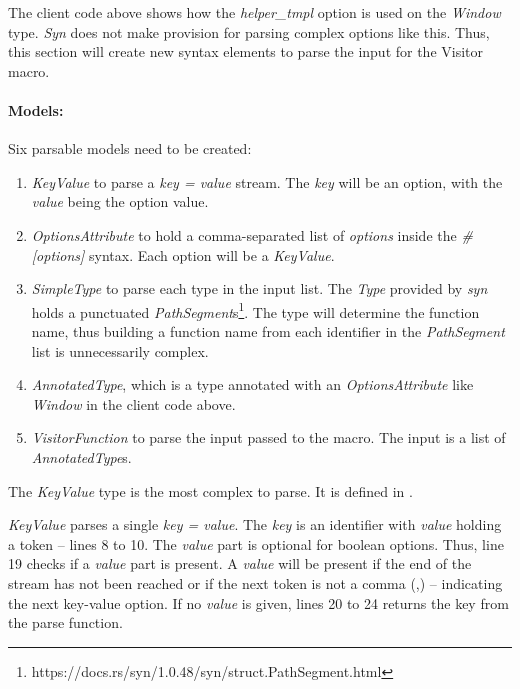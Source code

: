 The client code above shows how the \textit{helper\_tmpl} option is used on the \textit{Window} type.
\textit{Syn} does not make provision for parsing complex options like this.
Thus, this section will create new syntax elements to parse the input for the Visitor macro.

\paragraph{Models:}
Six parsable models need to be created:
\begin{enumerate}
	\item \textit{KeyValue} to parse a \textit{key = value} stream.
	      The \textit{key} will be an option, with the \textit{value} being the option value.
	\item \textit{OptionsAttribute} to hold a comma-separated list of \textit{options} inside the \textit{\#[options]} syntax.
	      Each option will be a \textit{KeyValue}.
	\item \textit{SimpleType} to parse each type in the input list.
	      The \textit{Type} provided by \textit{syn} holds a punctuated \textit{PathSegment}s\footnote{https://docs.rs/syn/1.0.48/syn/struct.PathSegment.html}.
	      The type will determine the function name, thus building a function name from each identifier in the \textit{PathSegment} list is unnecessarily complex.
	\item \textit{AnnotatedType}, which is a type annotated with an \textit{OptionsAttribute} like \textit{Window} in the client code above.
	\item \textit{VisitorFunction} to parse the input passed to the macro.
	      The input is a list of \textit{AnnotatedType}s.
\end{enumerate}

The \textit{KeyValue} type is the most complex to parse.
It is defined in .

\textit{KeyValue} parses a single \textit{key = value}.
The \textit{key} is an identifier with \textit{value} holding a token -- lines 8 to 10.
The \textit{value} part is optional for boolean options.
Thus, line 19 checks if a \textit{value} part is present.
A \textit{value} will be present if the end of the stream has not been reached or if the next token is not a comma (,) -- indicating the next key-value option.
If no \textit{value} is given, lines 20 to 24 returns the key from the parse function.

